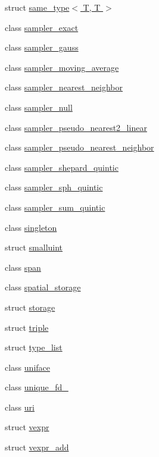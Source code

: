 \begin{DoxyCompactItemize}
\item 
struct \hyperlink{structmui_1_1same__type_3_01_t_00_01_t_01_4}{same\+\_\+type$<$ T, T $>$}
\item 
class \hyperlink{classmui_1_1sampler__exact}{sampler\+\_\+exact}
\item 
class \hyperlink{classmui_1_1sampler__gauss}{sampler\+\_\+gauss}
\item 
class \hyperlink{classmui_1_1sampler__moving__average}{sampler\+\_\+moving\+\_\+average}
\item 
class \hyperlink{classmui_1_1sampler__nearest__neighbor}{sampler\+\_\+nearest\+\_\+neighbor}
\item 
class \hyperlink{classmui_1_1sampler__null}{sampler\+\_\+null}
\item 
class \hyperlink{classmui_1_1sampler__pseudo__nearest2__linear}{sampler\+\_\+pseudo\+\_\+nearest2\+\_\+linear}
\item 
class \hyperlink{classmui_1_1sampler__pseudo__nearest__neighbor}{sampler\+\_\+pseudo\+\_\+nearest\+\_\+neighbor}
\item 
class \hyperlink{classmui_1_1sampler__shepard__quintic}{sampler\+\_\+shepard\+\_\+quintic}
\item 
class \hyperlink{classmui_1_1sampler__sph__quintic}{sampler\+\_\+sph\+\_\+quintic}
\item 
class \hyperlink{classmui_1_1sampler__sum__quintic}{sampler\+\_\+sum\+\_\+quintic}
\item 
class \hyperlink{classmui_1_1singleton}{singleton}
\item 
struct \hyperlink{structmui_1_1smalluint}{smalluint}
\item 
class \hyperlink{classmui_1_1span}{span}
\item 
class \hyperlink{classmui_1_1spatial__storage}{spatial\+\_\+storage}
\item 
struct \hyperlink{structmui_1_1storage}{storage}
\item 
struct \hyperlink{structmui_1_1triple}{triple}
\item 
struct \hyperlink{structmui_1_1type__list}{type\+\_\+list}
\item 
class \hyperlink{classmui_1_1uniface}{uniface}
\item 
class \hyperlink{classmui_1_1unique__fd__}{unique\+\_\+fd\+\_\+}
\item 
class \hyperlink{classmui_1_1uri}{uri}
\item 
struct \hyperlink{structmui_1_1vexpr}{vexpr}
\item 
struct \hyperlink{structmui_1_1vexpr__add}{vexpr\+\_\+add}

\end{DoxyCompactItemize}
